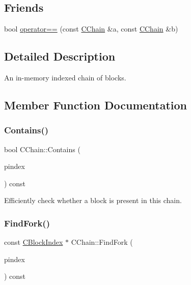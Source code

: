 \subsection*{Friends}
\begin{DoxyCompactItemize}
\item 
bool \mbox{\hyperlink{class_c_chain_a0e46ed4192afeafb8d420b2d6d9bb24c}{operator==}} (const \mbox{\hyperlink{class_c_chain}{C\+Chain}} \&a, const \mbox{\hyperlink{class_c_chain}{C\+Chain}} \&b)
\end{DoxyCompactItemize}


\subsection{Detailed Description}
An in-\/memory indexed chain of blocks. 

\subsection{Member Function Documentation}
\mbox{\label{class_c_chain_af1786dc229c215dea7f727c11df2c8dc}} 
\subsubsection{\texorpdfstring{Contains()}{Contains()}}
{\footnotesize\ttfamily bool C\+Chain\+::\+Contains (\begin{DoxyParamCaption}\item[{const \mbox{\hyperlink{class_c_block_index}{C\+Block\+Index}} $\ast$}]{pindex }\end{DoxyParamCaption}) const\hspace{0.3cm}{\ttfamily [inline]}}

Efficiently check whether a block is present in this chain. \mbox{\label{class_c_chain_adb9ec01329511e869bba95e3c143da71}} 
\subsubsection{\texorpdfstring{Find\+Fork()}{FindFork()}}
{\footnotesize\ttfamily const \mbox{\hyperlink{class_c_block_index}{C\+Block\+Index}} $\ast$ C\+Chain\+::\+Find\+Fork (\begin{DoxyParamCaption}\item[{const \mbox{\hyperlink{class_c_block_index}{C\+Block\+Index}} $\ast$}]{pindex }\end{DoxyParamCaption}) const}

